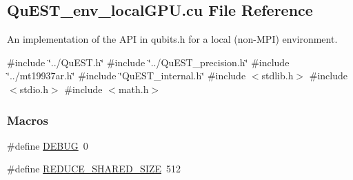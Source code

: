 \hypertarget{QuEST__env__localGPU_8cu}{}\subsection{Qu\+E\+S\+T\+\_\+env\+\_\+local\+G\+P\+U.\+cu File Reference}
\label{QuEST__env__localGPU_8cu}


An implementation of the A\+PI in qubits.\+h for a local (non-\/\+M\+PI) environment.  


{\ttfamily \#include \char`\"{}../\+Qu\+E\+S\+T.\+h\char`\"{}}\newline
{\ttfamily \#include \char`\"{}../\+Qu\+E\+S\+T\+\_\+precision.\+h\char`\"{}}\newline
{\ttfamily \#include \char`\"{}../mt19937ar.\+h\char`\"{}}\newline
{\ttfamily \#include \char`\"{}Qu\+E\+S\+T\+\_\+internal.\+h\char`\"{}}\newline
{\ttfamily \#include $<$stdlib.\+h$>$}\newline
{\ttfamily \#include $<$stdio.\+h$>$}\newline
{\ttfamily \#include $<$math.\+h$>$}\newline
\subsubsection*{Macros}
\begin{DoxyCompactItemize}
\item 
\#define \mbox{\hyperlink{QuEST__env__localGPU_8cu_ad72dbcf6d0153db1b8d8a58001feed83}{D\+E\+B\+UG}}~0
\item 
\#define \mbox{\hyperlink{QuEST__env__localGPU_8cu_aa57d77a0903e334e963c66ddc5ed3f53}{R\+E\+D\+U\+C\+E\+\_\+\+S\+H\+A\+R\+E\+D\+\_\+\+S\+I\+ZE}}~512
\end{DoxyCompactItemize}
